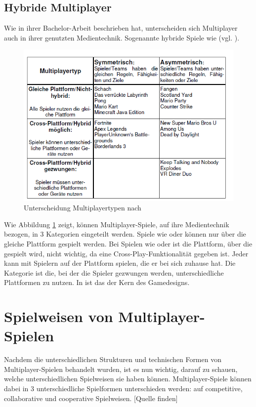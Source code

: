 \subsection{Hybride Multiplayer}
Wie \cite[S. 6f]{lotz_konzeption_2021} in ihrer Bachelor-Arbeit beschrieben hat, unterscheiden sich Multiplayer auch in ihrer genutzten Medientechnik. Sogenannte hybride Spiele wie  (vgl. \cite{noauthor_mario_nodate-1}).

\begin{figure}[ht]
\centering
\includegraphics[width=1\linewidth]{content/pictures/lotz_hybrid_multiplayer.PNG}
\caption{Unterscheidung Multiplayertypen nach \cite[S.6]{lotz_konzeption_2021}}
\label{fig:lotz_multiplayer_types}
\end{figure}

Wie Abbildung \ref{fig:lotz_multiplayer_types} zeigt, können Multiplayer-Spiele, auf ihre Medientechnik bezogen, in 3 Kategorien eingeteilt werden.
Spiele wie  oder  können nur über die gleiche Plattform gespielt werden. Bei Spielen wie  oder  ist die Plattform, über die gespielt wird, nicht wichtig, da eine Cross-Play-Funktionalität gegeben ist. Jeder kann mit Spielern auf der Plattform spielen, die er bei sich zuhause hat. Die Kategorie ist die, bei der die Spieler gezwungen werden, unterschiedliche Plattformen zu nutzen. In  ist das der Kern des Gamedesigns.

\section{Spielweisen von Multiplayer-Spielen}
Nachdem die unterschiedlichen Strukturen und technischen Formen von Multiplayer-Spielen behandelt wurden, ist es nun wichtig, darauf zu schauen, welche unterschiedlichen Spielweisen sie haben können. Multiplayer-Spiele können dabei in 3 unterschiedliche Spielformen unterschieden werden:
auf competitive, collaborative und cooperative Spielweisen. [Quelle finden]

